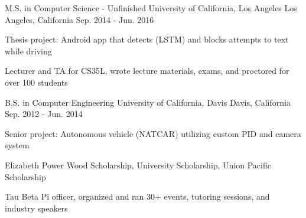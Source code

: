 

\begin{cventries}

\cventry
{M.S. in Computer Science - Unfinished} %
{University of California, Los Angeles} %
{Los Angeles, California} %
{Sep. 2014 - Jun. 2016} %
{} %
{
    \begin{cvitems} %
    \item {Thesis project: Android app that detects (LSTM) and blocks attempts to text while driving}
    \item {Lecturer and TA for CS35L, wrote lecture materials, exams, and proctored for over 100 students}
    \end{cvitems}
}


  \cventry
    {B.S. in Computer Engineering} %
    {University of California, Davis} %
    {Davis, California} %
    {Sep. 2012 - Jun. 2014} %
    {} %
    {
      \begin{cvitems} %
        \item {Senior project: Autonomous vehicle (NATCAR) utilizing custom PID and camera system}
        \item {Elizabeth Power Wood Scholarship, University Scholarship, Union Pacific Scholarship}
        \item {Tau Beta Pi officer, organized and ran 30+ events, tutoring sessions, and industry speakers}
      \end{cvitems}
    }
\end{cventries}
